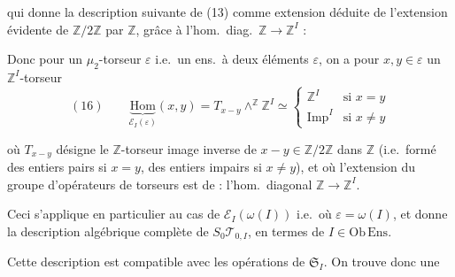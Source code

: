 \documentclass[11pt,a4paper]{article}
\begin{document}

qui donne la description suivante de (13) comme extension déduite de l'extension évidente de $\mathbb{Z}/2\mathbb{Z}$ par $\mathbb{Z}$, grâce à l'hom.\ diag.\ $\mathbb{Z} \to \mathbb{Z}^I$ :



Donc pour un $\mu_2$-torseur $\varepsilon$ i.e.\ un ens.\ à deux éléments $\varepsilon$, on a pour $x, y \in \varepsilon$ un $\mathbb{Z}^I$-torseur
\[
  (16) \qquad \underbrace{\mathrm{Hom}}_{\mathcal{E}_I(\varepsilon)}(x,y)
  = T_{x-y} \wedge^{\mathbb{Z}} \mathbb{Z}^I \simeq
  \begin{cases}
    \mathbb{Z}^I & \text{si } x = y \\
    \mathrm{Imp}^I & \text{si } x \neq y
  \end{cases}
\]

où  $T_{x-y}$ désigne le $\mathbb{Z}$-torseur  image inverse de $x - y \in \mathbb{Z}/2\mathbb{Z}$ dans $\mathbb{Z}$ (i.e.\ formé des entiers pairs si $x = y$, des entiers impairs si $x \neq y$), et où l'extension du groupe d'opérateurs de torseurs est  de : l'hom.\ diagonal $\mathbb{Z} \to \mathbb{Z}^I$.

Ceci s'applique en particulier au cas de $\mathcal{E}_I(\omega(I))$ i.e.\ où $\varepsilon = \omega(I)$, et donne la description algébrique complète de $S_0\mathcal{T}_{0,I}$, en termes de $I \in \mathrm{Ob}\,\mathrm{Ens}$.

Cette description est compatible avec les opérations de $\mathfrak{S}_I$. On trouve donc une
\end{document}
